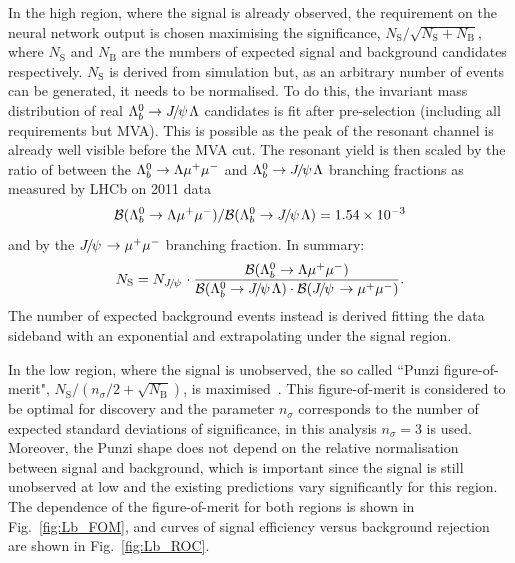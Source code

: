 In the high \qsq region, where the signal is already observed, the requirement on the neural network output
is chosen maximising the significance, $N_{\mathrm{S}}/\sqrt{N_{\mathrm{S}}+N_{\mathrm{B}}}$, where
$N_\mathrm{S}$ and $N_\mathrm{B}$ are the numbers of expected signal and background candidates respectively.
$N_\mathrm{S}$ is derived from simulation but, as an arbitrary number of events can be generated, it
needs to be normalised. To do this, the invariant mass distribution of real $\Lb\to\jpsi\Lz$ candidates
is fit after pre-selection (including all requirements but MVA). This is possible as the peak of the resonant
channel is already well visible before the MVA cut. The resonant yield is then scaled by the ratio
of between the ${{\Lambda}^0_{b}}\rightarrow{\ensuremath{\Lambda}}{\ensuremath{\mu^+\mu^-}}$ and $\Lb\to\jpsi\Lz$ branching fractions as measured 
by LHCb on 2011 data 
\begin{equation}
\BR(\Lb\to\Lz\mumu) / \BR(\Lb\to\jpsi\Lz) =  1.54 \times 10^{-3}
\end{equation}
\noindent
and by the $\jpsi\to\mumu$ branching fraction. In summary:
\begin{equation}
N_\mathrm{S} = N_\jpsi \cdot \frac{\BR(\Lb\to\Lz\mumu)}{\BR(\Lb\to\jpsi\Lz) \cdot \BR(\jpsi\to\mumu) }.
\end{equation}
%
The number of expected background events instead is derived fitting the data
sideband with an exponential and extrapolating under the signal region.

In the low \qsq region, where the signal is unobserved, the so called ``Punzi figure-of-merit",
$N_{\mathrm{S}}/(n_\sigma/2+\sqrt{N_{\mathrm{B}}})$, is maximised~\cite{Punzi:2003bu}.
This figure-of-merit is considered to be optimal for discovery and the parameter $n_\sigma$ corresponds to
the number of expected standard deviations of significance, in this analysis $n_\sigma = 3$ is used.
Moreover, the Punzi shape does not depend on the relative normalisation between signal and background, which
is important since the signal is still unobserved at low \qsq and the existing predictions vary significantly
for this region. The dependence of the figure-of-merit for both \qsq regions is shown in Fig.~\ref{fig:Lb_FOM}, and curves
of signal efficiency versus background rejection are shown in Fig.~\ref{fig:Lb_ROC}.

